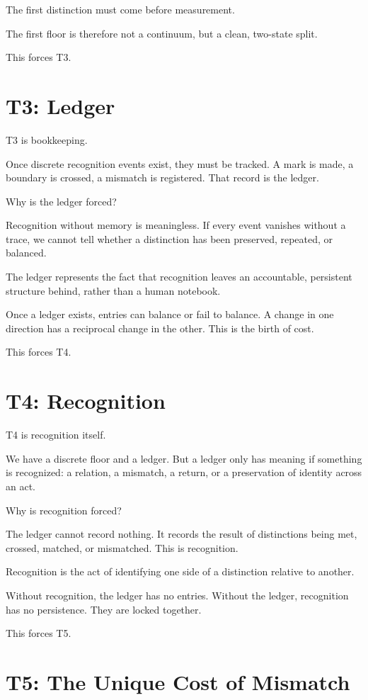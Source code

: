 \documentclass[11pt]{article}
\begin{document}
The first distinction must come before measurement.

The first floor is therefore not a continuum, but a clean, two-state split.

This forces T3.

\section{T3: Ledger}

T3 is bookkeeping.

Once discrete recognition events exist, they must be tracked. A mark is made, a boundary is crossed, a mismatch is registered. That record is the ledger.

Why is the ledger forced?

Recognition without memory is meaningless. If every event vanishes without a trace, we cannot tell whether a distinction has been preserved, repeated, or balanced.

The ledger represents the fact that recognition leaves an accountable, persistent structure behind, rather than a human notebook.

Once a ledger exists, entries can balance or fail to balance. A change in one direction has a reciprocal change in the other. This is the birth of cost.

This forces T4.

\section{T4: Recognition}

T4 is recognition itself.

We have a discrete floor and a ledger. But a ledger only has meaning if something is recognized: a relation, a mismatch, a return, or a preservation of identity across an act.

Why is recognition forced?

The ledger cannot record nothing. It records the result of distinctions being met, crossed, matched, or mismatched. This is recognition.

Recognition is the act of identifying one side of a distinction relative to another.

Without recognition, the ledger has no entries. Without the ledger, recognition has no persistence. They are locked together.

This forces T5.

\section{T5: The Unique Cost of Mismatch}
\end{document}

